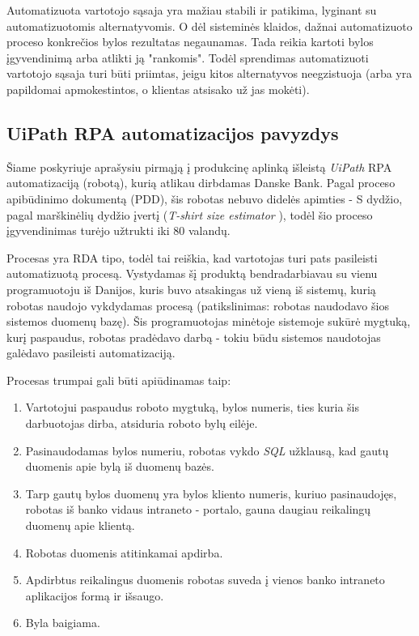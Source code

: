 \documentclass{VUMIFPSBakPrakAt}
\begin{document}
\vspace{10pt}
\par
Automatizuota vartotojo sąsaja yra mažiau stabili ir patikima, lyginant su automatizuotomis alternatyvomis. O dėl sisteminės klaidos, dažnai automatizuoto proceso konkrečios bylos rezultatas negaunamas. Tada reikia kartoti bylos įgyvendinimą arba atlikti ją "rankomis". Todėl sprendimas automatizuoti vartotojo sąsaja turi būti priimtas, jeigu kitos alternatyvos neegzistuoja (arba yra papildomai apmokestintos, o klientas atsisako už jas mokėti).

\subsection{UiPath RPA automatizacijos pavyzdys}

Šiame poskyriuje aprašysiu pirmąją į produkcinę aplinką išleistą \textit{UiPath} RPA automatizaciją (robotą), kurią atlikau dirbdamas Danske Bank. Pagal proceso apibūdinimo dokumentą (PDD), šis robotas nebuvo didelės apimties - S dydžio, pagal marškinėlių dydžio įvertį (\textit{T-shirt size estimator} \cite{TshirtSize}), todėl šio proceso įgyvendinimas turėjo užtrukti iki 80 valandų. 
\par
Procesas yra RDA tipo, todėl tai reiškia, kad vartotojas turi pats pasileisti automatizuotą procesą. Vystydamas šį produktą bendradarbiavau su vienu programuotoju iš Danijos, kuris buvo atsakingas už vieną iš sistemų, kurią robotas naudojo vykdydamas procesą (patikslinimas: robotas naudodavo šios sistemos duomenų bazę). Šis programuotojas minėtoje sistemoje sukūrė mygtuką, kurį paspaudus, robotas pradėdavo darbą - tokiu būdu sistemos naudotojas galėdavo pasileisti automatizaciją.
\par
Procesas trumpai gali būti apiūdinamas taip:
\vspace{10pt}
\begin{enumerate}
    \item\label{item:robot-start} Vartotojui paspaudus roboto mygtuką, bylos numeris, ties kuria šis darbuotojas dirba, atsiduria roboto bylų eilėje.
    \item\label{item:sql} Pasinaudodamas bylos numeriu, robotas vykdo \textit{SQL} užklausą, kad gautų duomenis apie bylą iš duomenų bazės.
    \item\label{item:portal} Tarp gautų bylos duomenų yra bylos kliento numeris, kuriuo pasinaudojęs, robotas iš banko vidaus intraneto - portalo, gauna daugiau reikalingų duomenų apie klientą.
    \item\label{item:processing} Robotas duomenis atitinkamai apdirba.
    \item\label{item:form} Apdirbtus reikalingus duomenis robotas suveda į vienos banko intraneto aplikacijos formą ir išsaugo.
    \item\label{item:robot-end} Byla baigiama.
\end{enumerate}
\end{document}
